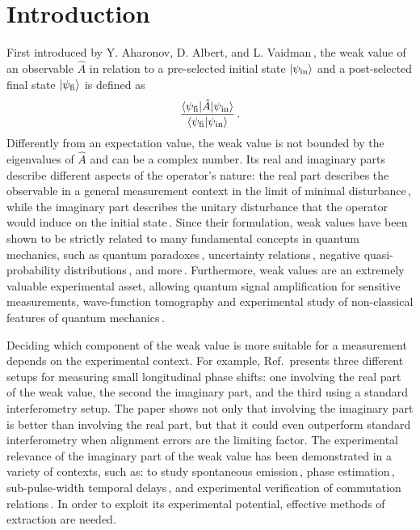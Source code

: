 \documentclass[12pt]{iopart}
\begin{document}
\section{\label{sec:Intro}Introduction}
First introduced by Y. Aharonov, D. Albert, and L. Vaidman\,\cite{aharonov1988}, the weak value of an observable $\hat{A}$ in relation to a pre-selected initial state $\ket{\psi_\mathrm{in}}$ and a post-selected final state $\ket{\psi_\mathrm{fi}}$ is defined as
\begin{align}
    \frac{\braket{\psi_\mathrm{fi}|\hat{A}|\psi_\mathrm{in}}}{\braket{\psi_\mathrm{fi}|\psi_\mathrm{in}}}\,.
\end{align}
Differently from an expectation value, the weak value is not bounded by the eigenvalues of $\hat{A}$ and can be a complex number. Its real and imaginary parts describe different aspects of the operator's nature: the real part describes the observable in a general measurement context in the limit of minimal disturbance\,\cite{dressel2010}, while the imaginary part describes the unitary disturbance that the operator would induce on the initial state\,\cite{dressel2012}. Since their formulation, weak values have been shown to be strictly related to many fundamental concepts in quantum mechanics, such as quantum paradoxes\,\cite{aharonov2002, lundeen2009}, uncertainty relations\,\cite{Hall2004}, negative quasi-probability distributions\,\cite{ozawa2011, dressel2015}, and more\,\cite{dressel2010,dressel2012,dressel2015}. Furthermore, weak values are an extremely valuable experimental asset, allowing quantum signal amplification for sensitive measurements, wave-function tomography and experimental study of non-classical features of quantum mechanics\,\cite{dressel2014}. 

Deciding which component of the weak value is more suitable for a measurement depends on the experimental context. For example, Ref.\,\cite{brunner2010} presents three different setups for measuring small longitudinal phase shifts: one involving the real part of the weak value, the second the imaginary part, and the third using a standard interferometry setup. The paper shows not only that involving the imaginary part is better than involving the real part, but that it could even outperform standard interferometry when alignment errors are the limiting factor. The experimental relevance of the imaginary part of the weak value has been demonstrated in a variety of contexts, such as: to study spontaneous emission\,\cite{shomroni2013}, phase estimation\,\cite{xu2013}, sub-pulse-width temporal delays\,\cite{salazar-serrano2014}, and experimental verification of commutation relations\,\cite{wagner2021}. In order to exploit its experimental potential, effective methods of extraction are needed.
\end{document}
